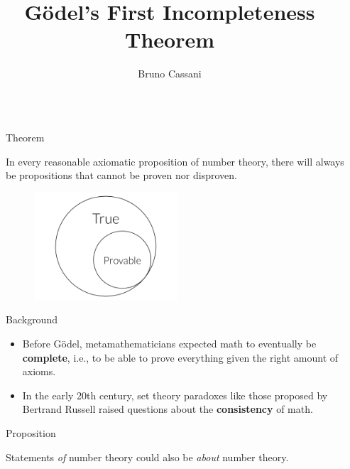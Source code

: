 \documentclass[final]{beamer} %
\title{Gödel's First Incompleteness Theorem}
\author{Bruno Cassani}
\institute[shortinst]{\textbf{Morrissey College of Arts and Sciences}, Boston College}
\newlength{\sepwidth}
\newlength{\colwidth}
\newcommand{\separatorcolumn}{\begin{column}{\sepwidth}\end{column}}
\begin{document}
\begin{frame}[t]
\begin{columns}[t]
\separatorcolumn

\begin{column}{\colwidth}



  \begin{alertblock}{Theorem}

    In every reasonable axiomatic proposition of number theory, there will always be propositions that cannot be proven nor disproven.

    \begin{figure}
      \centering
            \includegraphics[width=0.5\textwidth]{figures/Draw_1.png}
    \end{figure}

  \end{alertblock}
  
\begin{block}{Background}

    \begin{itemize}
      \item Before Gödel, metamathematicians expected math to eventually be \textbf{complete}, i.e., to be able to prove everything given the right amount of axioms.
      \item In the early 20th century, set theory paradoxes like those proposed by Bertrand Russell raised questions about the \textbf{consistency} of math.
        
    \end{itemize}

\end{block}

\begin{exampleblock}{Proposition}

      Statements \textit{of} number theory could also be \textit{about} number theory.

\end{exampleblock}


\end{column}
\end{columns}
\end{frame}
\end{document}
